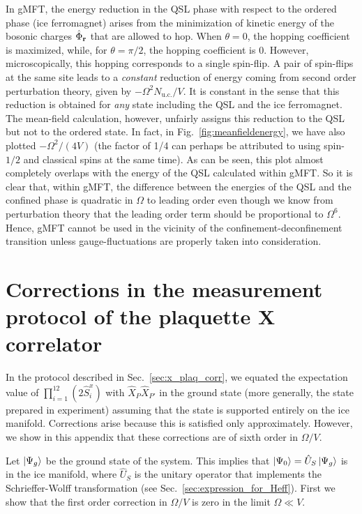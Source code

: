 \documentclass[twocolumn,superscriptaddress,amsmath,amssymb,aps,prx,nofootinbib]{revtex4-2}
\begin{document}
In gMFT, the energy reduction in the QSL phase with respect to the ordered phase (ice ferromagnet) arises from the minimization of kinetic energy of the bosonic charges $\hat{\Phi}_{\vb{r}}$ that are allowed to hop. When $\theta=0$, the hopping coefficient is maximized, while, for $\theta=\pi/2$, the hopping coefficient is 0. However, microscopically, this hopping corresponds to a single spin-flip. A pair of spin-flips at the same site leads to a \textit{constant} reduction of energy coming from second order perturbation theory, given by $-\Omega^2 N_{\text{u.c.}}/V$. It is constant in the sense that this reduction is obtained for \textit{any} state including the QSL and the ice ferromagnet. The mean-field calculation, however, unfairly assigns this reduction to the QSL but not to the ordered state. In fact, in Fig.~\ref{fig:meanfieldenergy}, we have also plotted $-\Omega^2/(4V)$ (the factor of 1/4 can perhaps be attributed to using spin-$1/2$ and classical spins at the same time). As can be seen, this plot almost completely overlaps with the energy of the QSL calculated within gMFT. So it is clear that, within gMFT, the difference between the energies of the QSL and the confined phase is quadratic in $\Omega$ to leading order even though we know from perturbation theory that the leading order term should be proportional to $\Omega^6$. Hence, gMFT cannot be used in the vicinity of the confinement-deconfinement transition unless gauge-fluctuations are properly taken into consideration.



\section{Corrections in the measurement protocol of the plaquette X correlator}\label{sec:corrections_plaq}



 In the protocol described in Sec.~\ref{sec:x_plaq_corr}, we equated the expectation value of $\prod_{i=1}^{12} (2 \hat{S}_i^x)$ with $ \hat{X}_P \hat{X}_{P'}$ in the ground state (more generally, the state prepared in experiment) assuming that the state is supported entirely on the ice manifold. Corrections arise because this is satisfied only approximately. However, we show in this appendix that these corrections are of sixth order in $\Omega/V$.


Let $\ket{\Psi_g}$ be the ground state of the system. This implies that $\ket{\Psi_0} = \hat{U}_S \ket{\Psi_g}$ is in the ice manifold, where $\hat{U}_S$ is the unitary operator that implements the Schrieffer-Wolff transformation (see Sec.~\ref{sec:expression_for_Heff}). First we show that the first order correction in $\Omega/V$ is zero in the limit $\Omega \ll V$. 
\end{document}
